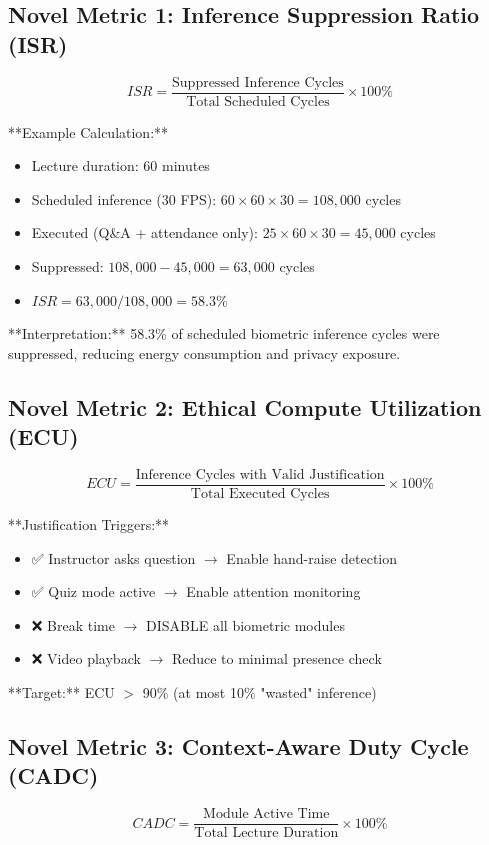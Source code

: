 \documentclass[conference]{IEEEtran}
\begin{document}
\subsection{Novel Metric 1: Inference Suppression Ratio (ISR)}
\begin{equation}
ISR = \frac{\text{Suppressed Inference Cycles}}{\text{Total Scheduled Cycles}} \times 100\%
\end{equation}

**Example Calculation:**
\begin{itemize}
    \item Lecture duration: 60 minutes
    \item Scheduled inference (30 FPS): $60 \times 60 \times 30 = 108,000$ cycles
    \item Executed (Q\&A + attendance only): $25 \times 60 \times 30 = 45,000$ cycles
    \item Suppressed: $108,000 - 45,000 = 63,000$ cycles
    \item $ISR = 63,000 / 108,000 = 58.3\%$
\end{itemize}

**Interpretation:** 58.3\% of scheduled biometric inference cycles were suppressed, reducing energy consumption and privacy exposure.

\subsection{Novel Metric 2: Ethical Compute Utilization (ECU)}
\begin{equation}
ECU = \frac{\text{Inference Cycles with Valid Justification}}{\text{Total Executed Cycles}} \times 100\%
\end{equation}

**Justification Triggers:**
\begin{itemize}
    \item ✅ Instructor asks question $\to$ Enable hand-raise detection
    \item ✅ Quiz mode active $\to$ Enable attention monitoring
    \item ❌ Break time $\to$ DISABLE all biometric modules
    \item ❌ Video playback $\to$ Reduce to minimal presence check
\end{itemize}

**Target:** ECU $>$ 90\% (at most 10\% "wasted" inference)

\subsection{Novel Metric 3: Context-Aware Duty Cycle (CADC)}
\begin{equation}
CADC = \frac{\text{Module Active Time}}{\text{Total Lecture Duration}} \times 100\%
\end{equation}
\end{document}
